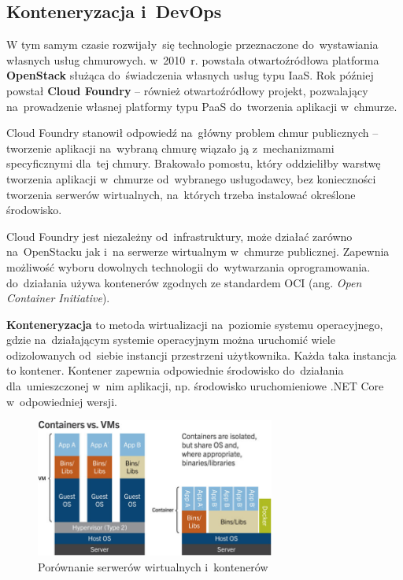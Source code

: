\documentclass[12pt,a4paper,twoside,titlepage,openright]{book}
\begin{document}
\subsection{Konteneryzacja i~DevOps} \label{section:konteneryzacja}

W tym samym czasie rozwijały~się technologie przeznaczone do~wystawiania własnych usług chmurowych. w~2010~r. powstała otwartoźródłowa platforma \textbf{OpenStack} służąca do~świadczenia własnych usług typu IaaS. Rok później powstał \textbf{Cloud Foundry} -- również otwartoźródłowy projekt, pozwalający na~prowadzenie własnej platformy typu PaaS do~tworzenia aplikacji w~chmurze. 

Cloud Foundry stanowił odpowiedź na~główny problem chmur publicznych -- tworzenie aplikacji na~wybraną chmurę wiązało ją z~mechanizmami specyficznymi dla~tej chmury. Brakowało pomostu, który oddzieliłby warstwę tworzenia aplikacji w~chmurze od~wybranego usługodawcy, bez konieczności tworzenia serwerów wirtualnych, na~których trzeba instalować określone środowisko. \cite{cloudFoundry}

Cloud Foundry jest niezależny od~infrastruktury, może działać zarówno na~OpenStacku jak i~na serwerze wirtualnym w~chmurze publicznej. Zapewnia możliwość wyboru dowolnych technologii do~wytwarzania oprogramowania. do~działania używa kontenerów zgodnych ze standardem OCI (ang. \textit{Open Container Initiative}). \cite{cloudFoundry} 

\textbf{Konteneryzacja} to metoda wirtualizacji na~poziomie systemu operacyjnego, gdzie na~działającym systemie operacyjnym można uruchomić wiele odizolowanych od~siebie instancji przestrzeni użytkownika. Każda taka instancja to kontener. Kontener zapewnia odpowiednie środowisko do~działania dla~umieszczonej w~nim aplikacji, np. środowisko uruchomieniowe .NET Core w~odpowiedniej wersji.  \cite{cloudFoundry,ccSpringer}

\begin{figure}[h]
	\centering
			\includegraphics[width=0.7\textwidth]{containers-vs-vms.png}
		\caption{Porównanie serwerów wirtualnych i~kontenerów \cite{ccSpringer}}
		\label{fig:containers-vs-vms}
\end{figure}
\end{document}
